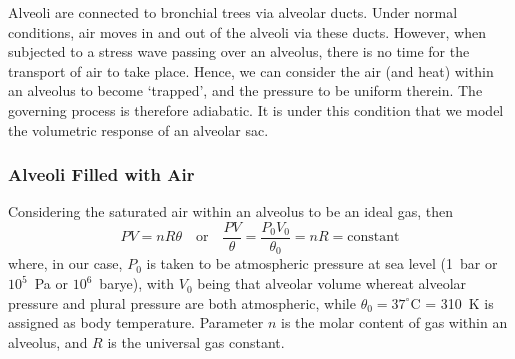 Alveoli are connected to bronchial trees via alveolar ducts.  Under normal conditions, air moves in and out of the alveoli via these ducts.  However, when subjected to a stress wave passing over an alveolus, there is no time for the transport of air to take place.  Hence, we can consider the air (and heat) within an alveolus to become `trapped', and the pressure to be uniform therein.  The governing process is therefore adiabatic.  It is under this condition that we model the volumetric response of an alveolar sac.

\subsubsection{Alveoli Filled with Air}

Considering the saturated air within an alveolus to be an ideal gas, then \cite{Davison08}
\begin{equation}
P V = n \! R \theta
\quad \text{or} \quad
\frac{P V}{\theta} = \frac{P_0 V_0}{\theta_0} = n \! R = \mathrm{constant}
\label{idealGas}
\end{equation}
where, in our case, $P_0$ is taken to be atmospheric pressure at sea level (1~bar or $10^5$~Pa or $10^6$~barye), with $V_0$ being that alveolar volume whereat alveolar pressure and plural pressure are both atmospheric, while $\theta_0 = 37^{\circ}$C = 310~K is assigned as body temperature.  Parameter $n$ is the molar content of gas within an alveolus, and $R$ is the universal gas constant.  


